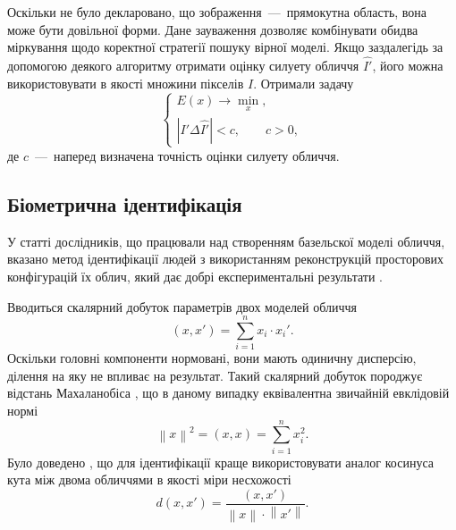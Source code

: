 Оскільки не було декларовано, що зображення~---~прямокутна область,
вона може бути довільної форми.
Дане зауваження дозволяє комбінувати обидва міркування
щодо коректної стратегії пошуку вірної моделі.
Якщо заздалегідь за допомогою деякого алгоритму отримати
оцінку силуету обличчя $\hat{I'}$,
його можна використовувати в якості множини пікселів $I$.
Отримали задачу
\begin{equation*}
  \begin{cases}
    E\left( x \right) \to \min\limits_x, \\
    \left| I' \Delta \hat{I'} \right| < c, \qquad c > 0,
  \end{cases}
\end{equation*}
де $c$~---~наперед визначена точність оцінки силуету обличчя.

\subsection{Біометрична ідентифікація}

У статті дослідників, що працювали над створенням базельскої моделі обличчя,
вказано метод ідентифікації людей з використанням реконструкцій
просторових конфігурацій їх облич,
який дає добрі експериментальні результати \cite{blanz:romdhani:vetter}.

Вводиться скалярний добуток параметрів двох моделей обличчя
\begin{equation*}
  \left( x, x' \right) = \sum_{i=1}^n x_i \cdot x_i'.
\end{equation*}
Оскільки головні компоненти нормовані,
вони мають одиничну дисперсію,
ділення на яку не впливає на результат.
Такий скалярний добуток породжує відстань Махаланобіса \cite{Haykin:1998},
що в даному випадку еквівалентна звичайній евклідовій нормі
\begin{equation*}
  \left\| x \right\|^2 = \left( x, x \right) = \sum_{i=1}^n x_i^2.
\end{equation*}
Було доведено \cite{Moon:2017},
що для ідентифікації краще використовувати аналог косинуса кута
між двома обличчями в якості міри несхожості
\begin{equation*}
  d\left( x, x' \right)
  = \frac{\left( x, x' \right)}{\left\| x \right\| \cdot \left\| x' \right\|}.
\end{equation*}
